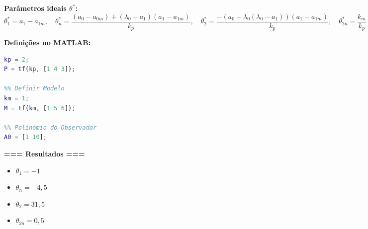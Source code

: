\documentclass[10pt]{article}
\begin{document}
\textbf{Parâmetros ideais $\theta^*$:}
\[
    \theta_1^* = a_1 - a_{1m}, \quad
    \theta_n^* = \frac{(a_0 - a_{0m}) + (\lambda_0 - a_1)(a_1 - a_{1m})}{k_p}, \quad
    \theta_2^* = \frac{-(a_0 + \lambda_0(\lambda_0 - a_1))(a_1 - a_{1m})}{k_p}, \quad
    \theta_{2n}^* = \frac{k_m}{k_p}
\]

\vspace{0.5cm}
\textbf{Definições no MATLAB:}
\begin{lstlisting}[language=Matlab]
%% Definir Planta
kp = 2;
P = tf(kp, [1 4 3]);

%% Definir Modelo
km = 1;
M = tf(km, [1 5 6]);

%% Polinômio do Observador
A0 = [1 10];
\end{lstlisting}

\vspace{0.5cm}
\textbf{=== Resultados ===}
\begin{itemize}
    \item $\theta_1 = -1$
    \item $\theta_n = -4{,}5$
    \item $\theta_2 = 31{,}5$
    \item $\theta_{2n} = 0{,}5$
\end{itemize}
\end{document}
